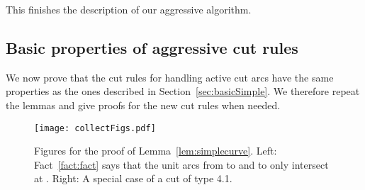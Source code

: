 \documentclass{article}
\begin{document}
This finishes the description of our aggressive algorithm.



\subsection{Basic properties of aggressive cut rules}

We now prove that the cut rules for handling active cut arcs have the same properties as the ones described in Section~\ref{sec:basicSimple}.
We therefore repeat the lemmas and give proofs for the new cut rules when needed.

\simplecurvelemma*


\begin{figure}
\centering
\texttt{[image: collectFigs.pdf]}
\caption{Figures for the proof of Lemma~\ref{lem:simplecurve}.
Left: Fact~\ref{fact:fact} says that the unit arcs from  to  and  to  only intersect at .
Right: A special case of a cut of type 4.1.
}
\label{fig:factetc}
\end{figure}
\end{document}
